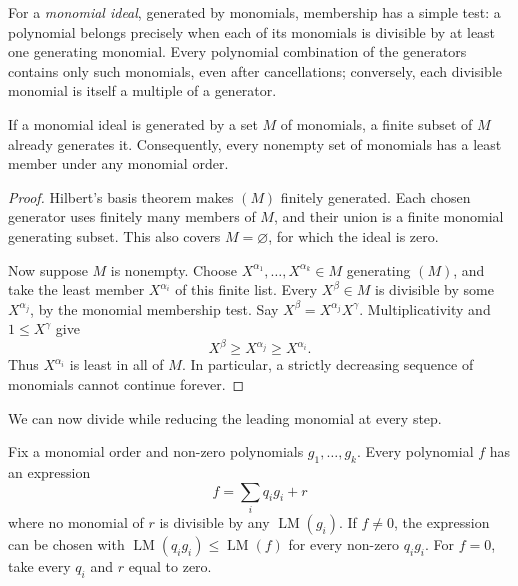 For a \emph{monomial ideal}, generated by monomials, membership has a simple test: a polynomial belongs precisely when each of its monomials is divisible by at least one generating monomial. Every polynomial combination of the generators contains only such monomials, even after cancellations; conversely, each divisible monomial is itself a multiple of a generator.

\begin{lemma}[Dickson]\label{lem:dickson}
If a monomial ideal is generated by a set $M$ of monomials, a finite subset of $M$ already generates it. Consequently, every nonempty set of monomials has a least member under any monomial order.
\end{lemma}

\begin{proof}
Hilbert's basis theorem makes $(M)$ finitely generated. Each chosen generator uses finitely many members of $M$, and their union is a finite monomial generating subset. This also covers $M=\varnothing$, for which the ideal is zero.

Now suppose $M$ is nonempty. Choose $X^{\alpha_1},\ldots,X^{\alpha_k}\in M$ generating $(M)$, and take the least member $X^{\alpha_i}$ of this finite list. Every $X^\beta\in M$ is divisible by some $X^{\alpha_j}$, by the monomial membership test. Say $X^\beta=X^{\alpha_j}X^\gamma$. Multiplicativity and $1\le X^\gamma$ give
\[
X^\beta\ge X^{\alpha_j}\ge X^{\alpha_i}.
\]
Thus $X^{\alpha_i}$ is least in all of $M$. In particular, a strictly decreasing sequence of monomials cannot continue forever.
\end{proof}

We can now divide while reducing the leading monomial at every step.

\begin{proposition}[division]\label{prop:division}
Fix a monomial order and non-zero polynomials $g_1,\ldots,g_k$. Every polynomial $f$ has an expression
\[
f=\sum_i q_ig_i+r
\]
where no monomial of $r$ is divisible by any $\operatorname{LM}(g_i)$. If $f\ne0$, the expression can be chosen with $\operatorname{LM}(q_ig_i)\le\operatorname{LM}(f)$ for every non-zero $q_ig_i$. For $f=0$, take every $q_i$ and $r$ equal to zero.
\end{proposition}

